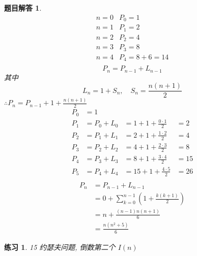 \documentclass[mode=geye, chinesefont=founder]{elegantnote}
\newtheorem{exercise}{练习}
\newtheorem{answer}{题目解答}
\begin{document}
\begin{answer}
	\begin{equation*}
		\begin{array}{ll}
			n=0	& P_0 = 1	\\
			n=1	& P_1 = 2	\\
			n=2 & P_2 = 4	\\
			n=3 & P_3 = 8	\\
			n=4 & P_4 = 8+6=14	\\
		\end{array}
	\end{equation*}
\begin{equation*}
	P_n = P_{n-1}+L_{n-1}
\end{equation*}
其中
\begin{equation*}
	L_n = 1+S_n,\quad S_n = \frac{n(n+1)}{2}
\end{equation*}
$ \therefore  P_n = P_{n-1}+1+\frac{n(n+1)}{2}$
\begin{equation*}
	\begin{array}{llll}
		P_0 &= 1 		& 							&		\\
		P_1 &= P_0+L_0 	&= 1+1+\frac{0\cdot 1 }{2} 	&= 2	\\ 
		P_2 &= P_1+L_1 	&= 2+1+\frac{1\cdot 2 }{2} 	&= 4	\\ 
		P_3 &= P_2+L_2 	&= 4+1+\frac{2\cdot 3 }{2} 	&= 8	\\ 
		P_4 &= P_3+L_3 	&= 8+1+\frac{3\cdot 4 }{2} 	&= 15	\\ 
		P_5 &= P_4+L_4 	&=15+1+\frac{4\cdot 5 }{2} 	&= 26	\\ 
	\end{array}
\end{equation*}
\begin{align*}
	P_n 
	&= P_{n-1}+L_{n-1} 		\\
	&= 0 + \sum_{k=0}^{n-1}\left(1+\frac{k(k+1)}{2}\right)	\\
	&= n + \frac{(n-1)n(n+1)}{6} \\
	&= \frac{n(n^2+5)}{6}
\end{align*}
\end{answer}

\begin{exercise}
	15 约瑟夫问题,  倒数第二个 $ I(n) $
\end{exercise}
\end{document}
